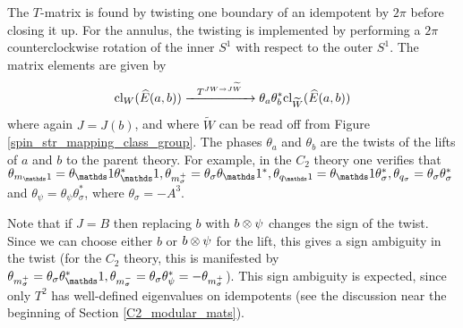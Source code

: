 The $T$-matrix is found by twisting one boundary of an idempotent by $2\pi$ before closing it up. 
For the annulus, the twisting is implemented by performing a $2\pi$ counterclockwise rotation of the inner $S^1$ with respect to the outer $S^1$.
The matrix elements are given by
\begin{align}
\text{cl}_W(\widehat{E}(a,b)) \xrightarrow{\; \; \; T^{JW \rightarrow J\widetilde{W}}\;\;\; } \theta_a \theta_b^* \text{cl}_{\widetilde{W}}(\widehat{E}(a,b))
\end{align}
where again $J = J(b)$, and where $\widetilde{W}$ can be read off from Figure \ref{spin_str_mapping_class_group}.
The phases $\theta_a$ and $\theta_b$ are the twists of the lifts of $a$ and $b$ to the parent theory.
For example, in the $C_2$ theory one verifies that $\theta_{m_\unit}=\theta_\unit\theta^*_\unit,\theta_{m_\sigma^+}=\theta_\sigma\theta_\unit^*,\theta_{q_\unit} = \theta_\unit\theta^*_\sigma,\theta_{q_\sigma}=\theta_\sigma\theta^*_\sigma$ and $\theta_{\psi}=\theta_\psi\theta^*_\sigma$, where $\theta_\sigma = -A^3$. 


Note that if $J = B$ then replacing $b$ with $b\otimes \psi$ changes the sign of the twist.
Since we can choose either $b$ or $b\otimes\psi$ for the lift, this gives a sign ambiguity in the twist (for the 
$C_2$ theory, this is manifested by $\theta_{m_\sigma^+} = \theta_\sigma\theta^*_\unit,\theta_{m_\sigma^-}=\theta_\sigma\theta^*_\psi=-\theta_{m_\sigma^+}$).
This sign ambiguity is expected, since only $T^2$ has well-defined eigenvalues 
on idempotents (see the discussion near the beginning of Section \ref{C2_modular_mats}). 




